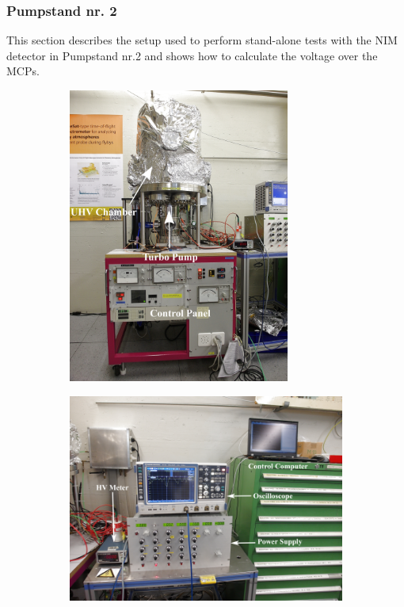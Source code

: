 		\subsubsection{Pumpstand nr. 2}\label{subsubsec:SetFacPumpst}
		This section describes the setup used to perform stand-alone tests with the NIM detector in Pumpstand nr.2 and shows how to calculate the voltage over the MCPs.\\
		\begin{figure}[h]
			\begin{subfigure}{.5\textwidth}
				\centering
				\includegraphics[width=0.8\textwidth]{Bilder/Galerie_Setup/Pumpstand2_midres.png}
			\end{subfigure}
			\begin{subfigure}{.5\textwidth}
				\centering
				\includegraphics[width=\textwidth]{Bilder/Galerie_Setup/Pumpstand_PSOszi.png}

\end{subfigure}
\end{figure}
